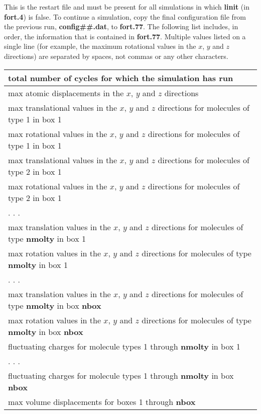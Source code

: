 \documentclass[12pt,letterpaper]{article}
\begin{document}
{{{{{{
This is the restart file and must be present for all simulations in which {\textbf{linit}} 
(in {\bf fort.4}) is false. 
To continue a simulation, copy the final configuration file from the previous run, {\bf config\#\#.dat}, to {\bf fort.77}.
The following list includes, in order, the information that is contained in {\bf fort.77}.  
Multiple values listed on a single line (for example, the maximum rotational values in the $x$, $y$ and $z$ directions) 
are separated by spaces, not commas or any other characters. 
\begin{center}
\begin{tabular}{| l |}
\hline
total number of cycles for which the simulation has run \\ \hline
max atomic displacements in the $x$, $y$ and $z$ directions  \\ \hline
max translational values in the $x$, $y$ and $z$ directions for molecules of type 1 in box 1 \\ \hline 
max rotational values in the $x$, $y$ and $z$ directions for molecules of type 1 in box 1 \\ \hline
max translational values in the $x$, $y$ and $z$ directions for molecules of type 2 in box 1 \\ \hline
max rotational values in the $x$, $y$ and $z$ directions for molecules of type 2 in box 1 \\ \hline
  . . . \\ \hline
max translation values in the $x$, $y$ and $z$ directions for molecules of type {\bf nmolty} in box 1 \\ \hline
max rotation values in the $x$, $y$ and $z$ directions for molecules of type {\bf nmolty} in box 1 \\ \hline
  . . . \\ \hline
max translation values in the $x$, $y$ and $z$ directions for molecules of type {\bf nmolty} in box {\bf nbox} \\ \hline
max rotation values in the $x$, $y$ and $z$ directions for molecules of type {\bf nmolty} in box {\bf nbox} \\ \hline
fluctuating charges for molecule types 1 through {\bf nmolty} in box 1 \\ \hline
  . . . \\ \hline
fluctuating charges for molecule types 1 through {\bf nmolty} in box {\bf nbox} \\ \hline
max volume displacements for boxes 1 through {\bf nbox} \\ \hline

\end{tabular}
\end{center}}}}}}}
\end{document}
